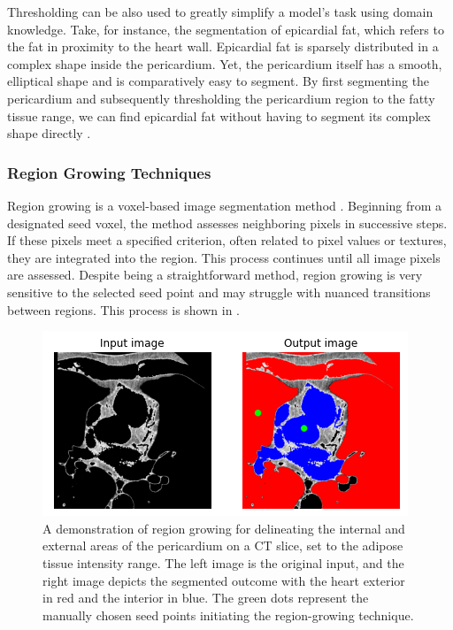 Thresholding can be also used to greatly simplify a model's task using domain knowledge. Take, for instance, the segmentation of epicardial fat, which refers to the fat in proximity to the heart wall. Epicardial fat is sparsely distributed in a complex shape inside the pericardium. Yet, the pericardium itself has a smooth, elliptical shape and is comparatively easy to segment. By first segmenting the pericardium and subsequently thresholding the pericardium region to the fatty tissue range, we can find epicardial fat without having to segment its complex shape directly \cite{bencevicRecentProgressEpicardial2022}.

\subsubsection{Region Growing Techniques}

Region growing is a voxel-based image segmentation method \citep{regionGrowing}. Beginning from a designated seed voxel, the method assesses neighboring pixels in successive steps. If these pixels meet a specified criterion, often related to pixel values or textures, they are integrated into the region. This process continues until all image pixels are assessed. Despite being a straightforward method, region growing is very sensitive to the selected seed point and may struggle with nuanced transitions between regions. This process is shown in .

\begin{figure}[h!]
 \centering
 \includegraphics[width=0.7\linewidth]{images/region_growing.png}
 \caption{A demonstration of region growing for delineating the internal and external areas of the pericardium on a CT slice, set to the adipose tissue intensity range. The left image is the original input, and the right image depicts the segmented outcome with the heart exterior in red and the interior in blue. The green dots represent the manually chosen seed points initiating the region-growing technique. \cite{bencevicRecentProgressEpicardial2022}}
 \label{fig:region-growing}
 \end{figure}


